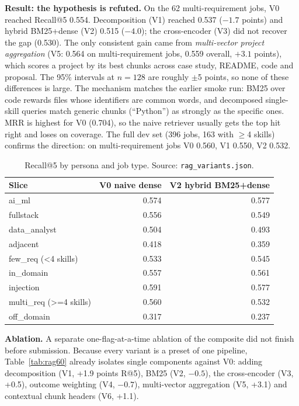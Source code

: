 \documentclass[10pt,a4paper]{article}
\begin{document}
\textbf{Result: the hypothesis is refuted.} On the 62 multi-requirement jobs, V0 reached Recall@5 0.554. Decomposition (V1) reached
0.537 ($-1.7$ points) and hybrid BM25+dense (V2) 0.515 ($-4.0$); the cross-encoder (V3) did not recover the gap (0.530). The
only consistent gain came from \emph{multi-vector project aggregation} (V5: 0.564 on multi-requirement jobs, 0.559 overall,
$+3.1$ points), which scores a project by its best chunks across case study, README, code and proposal. The 95\% intervals
at $n=128$ are roughly $\pm$5 points, so none of these differences is large. The mechanism matches the earlier smoke run: BM25
over code rewards files whose identifiers are common words, and decomposed single-skill queries match generic chunks
(``Python'') as strongly as the specific ones. MRR is highest for V0 (0.704), so the naive retriever usually gets the top hit
right and loses on coverage. The full dev set (396 jobs, 163 with $\ge$4 skills) confirms the direction: on multi-requirement jobs
V0 0.560, V1 0.550, V2 0.532.

\begin{table}[t]\centering\small\caption{Recall@5 by persona and job type. Source: \texttt{rag\_variants.json}.}\label{tab:ragbreak}
\begin{tabular}{lrr}\toprule Slice & V0 naive dense & V2 hybrid BM25+dense\\\midrule
ai\_ml & 0.574 & 0.577 \\
fullstack & 0.556 & 0.549 \\
data\_analyst & 0.504 & 0.493 \\
\midrule
adjacent & 0.418 & 0.359 \\
few\_req (<4 skills) & 0.533 & 0.545 \\
in\_domain & 0.557 & 0.561 \\
injection & 0.591 & 0.577 \\
multi\_req (>=4 skills) & 0.560 & 0.532 \\
off\_domain & 0.317 & 0.237 \\
\bottomrule\end{tabular}\end{table}
\textbf{Ablation.} A separate one-flag-at-a-time ablation of the composite did not finish before submission. Because every variant is a preset of one pipeline, Table~\ref{tab:rag60} already isolates single components against V0: adding decomposition (V1, +1.9 points R@5), BM25 (V2, $-0.5$), the cross-encoder (V3, +0.5), outcome weighting (V4, $-0.7$), multi-vector aggregation (V5, +3.1) and contextual chunk headers (V6, +1.1).
\end{document}
